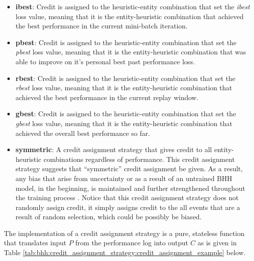 \begin{itemize}
      \item \textbf{ibest}: Credit is assigned to the heuristic-entity combination that set the \textit{ibest} loss value, meaning that it is the entity-heuristic combination that achieved the best performance in the current mini-batch iteration.

      \item \textbf{pbest}: Credit is assigned to the heuristic-entity combination that set the \textit{pbest} loss value, meaning that it is the entity-heuristic combination that was able to improve on it's personal best past performance loss.

      \item \textbf{rbest}: Credit is assigned to the heuristic-entity combination that set the \textit{rbest} loss value, meaning that it is the entity-heuristic combination that achieved the best performance in the current replay window.

      \item \textbf{gbest}: Credit is assigned to the heuristic-entity combination that set the \textit{gbest} loss value, meaning that it is the entity-heuristic combination that achieved the overall best performance so far.

      \item \textbf{symmetric}: A credit assignment strategy that gives credit to all entity-heuristic combinations regardless of performance. This credit assignment strategy suggests that ``symmetric'' credit assignment be given. As a result, any bias that arise from uncertainty or as a result of an untrained \ac{BHH} model, in the beginning, is maintained and further strengthened throughout the training process . Notice that this credit assignment strategy does not randomly assign credit, it simply assigns credit to the all events that are a result of random selection, which could be possibly be biased.
\end{itemize}

The implementation of a credit assignment strategy is a pure, stateless function that translates input $P$ from the performance log into output $C$ as is given in Table \ref{tab:bhh:credit_assignment_strategy:credit_assignment_example} below.


